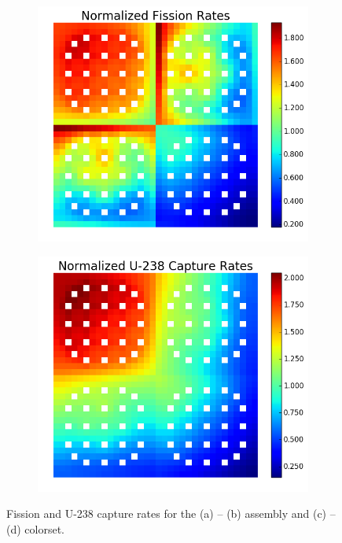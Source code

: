 \begin{figure}[h!]
\begin{subfigure}{0.45\textwidth}
  \caption{}
  \label{fig:capt-assm}
\end{subfigure}
\begin{subfigure}{0.45\textwidth}
  \centering
  \includegraphics[width=\linewidth]{figures/reflector/fission-rates}
  \caption{}
  \label{fig:fiss-reflector}
\end{subfigure}%
\begin{subfigure}{0.45\textwidth}
  \centering
  \includegraphics[width=\linewidth]{figures/reflector/capture-rates}
  \caption{}
  \label{fig:capt-reflector}
\end{subfigure}
\caption{Fission and U-238 capture rates for the (a) -- (b) assembly and (c) -- (d) colorset.}
\label{fig:fiss-capt-rates}
\end{figure}

